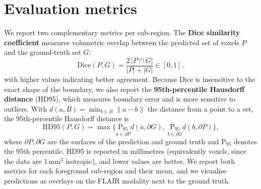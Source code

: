 \section{Evaluation metrics}
\label{sec:metrics}

We report two complementary metrics per sub-region. The \textbf{Dice similarity
coefficient} measures volumetric overlap between the predicted set of voxels $P$
and the ground-truth set $G$:
\begin{equation}
\mathrm{Dice}(P,G) = \frac{2\,|P \cap G|}{|P| + |G|} \in [0,1],
\end{equation}
with higher values indicating better agreement. Because Dice is insensitive to
the exact shape of the boundary, we also report the \textbf{95th-percentile
Hausdorff distance} (HD95), which measures boundary error and is more sensitive to
outliers. With $d(a,B)=\min_{b\in B}\lVert a-b\rVert$ the distance from a point to
a set, the 95th-percentile Hausdorff distance is
\begin{equation}
\mathrm{HD95}(P,G) = \max\Big\{
\operatorname*{P_{95}}_{a\in \partial P} d(a,\partial G),\;
\operatorname*{P_{95}}_{b\in \partial G} d(b,\partial P)
\Big\},
\end{equation}
where $\partial P,\partial G$ are the surfaces of the prediction and ground truth
and $\mathrm{P}_{95}$ denotes the 95th percentile. HD95 is reported in millimetres
(equivalently voxels, since the data are $1\,\mathrm{mm}^3$ isotropic), and lower
values are better. We report both metrics for each foreground sub-region and their
mean, and we visualise predictions as overlays on the FLAIR modality next to the
ground truth.
